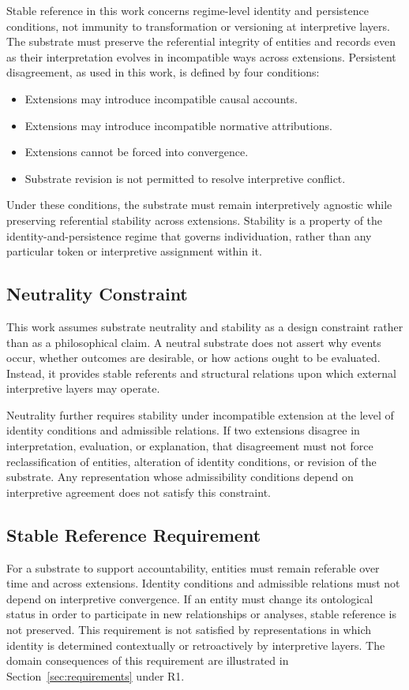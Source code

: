 Stable reference in this work concerns regime-level identity and persistence conditions,
not immunity to transformation or versioning at interpretive layers.
The substrate must preserve the referential integrity of entities and records
even as their interpretation evolves in incompatible ways across extensions.
Persistent disagreement, as used in this work, is defined by four conditions:
\begin{itemize}
\item Extensions may introduce incompatible causal accounts.
\item Extensions may introduce incompatible normative attributions.
\item Extensions cannot be forced into convergence.
\item Substrate revision is not permitted to resolve interpretive conflict.
\end{itemize}
Under these conditions, the substrate must remain interpretively agnostic
while preserving referential stability across extensions.
Stability is a property of the identity-and-persistence regime that governs individuation,
rather than any particular token or interpretive assignment within it.

\subsection{Neutrality Constraint}

This work assumes substrate neutrality and stability
as a design constraint rather than as a philosophical claim.
A neutral substrate does not assert why
events occur, whether outcomes are desirable, or
how actions ought to be evaluated.
Instead, it provides stable referents and structural relations upon which
external interpretive layers may operate.

Neutrality further requires stability under incompatible extension
at the level of identity conditions and admissible relations.
If two extensions disagree in interpretation, evaluation, or explanation,
that disagreement must not force reclassification of entities, alteration
of identity conditions, or revision of the substrate.
Any representation whose admissibility conditions depend on interpretive
agreement does not satisfy this constraint.

\subsection{Stable Reference Requirement}
\label{sec:stable_reference_requirement}
For a substrate to support accountability, entities must remain referable
over time and across extensions.
Identity conditions and admissible relations must not depend
on interpretive convergence.
If an entity must change its ontological status in order to participate in new
relationships or analyses, stable reference is not preserved.
This requirement is not satisfied by representations in which identity is
determined contextually or retroactively by interpretive layers.
The domain consequences of this requirement are illustrated in
Section~\ref{sec:requirements} under R1.

